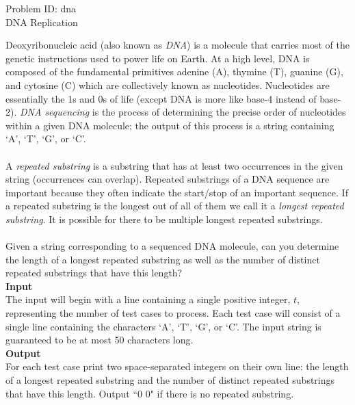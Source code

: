 \documentclass[a4paper,11pt]{article}
\begin{document}
\setcounter{page}{4}
\begin{center}
{\Huge Problem ID: dna}\vspace{2 mm} \\	%
{\huge DNA Replication}\vspace{2 mm} \\	%
\end{center}
\large{
Deoxyribonucleic acid (also known as \emph{DNA}) is a molecule that carries most of the genetic instructions used to power life on Earth. At a high level, DNA is composed of the fundamental primitives adenine (A), thymine (T), guanine (G), and cytosine (C) which are collectively known as nucleotides. Nucleotides are essentially the 1s and 0s of life (except DNA is more like base-4 instead of base-2). \emph{DNA sequencing} is the process of determining the precise order of nucleotides within a given DNA molecule; the output of this process is a string containing `A', `T', `G', or `C'.\\\\
A \emph{repeated substring} is a substring that has at least two occurrences in the given string (occurrences can overlap). Repeated substrings of a DNA sequence are important because they often indicate the start/stop of an important sequence. If a repeated substring is the longest out of all of them we call it a \emph{longest repeated substring}. It is possible for there to be multiple longest repeated substrings. \\\\
Given a string corresponding to a sequenced DNA molecule, can you determine the length of a longest repeated substring as well as the number of distinct repeated substrings that have this length?
}
\vspace{7mm}\\
\large{\bf{Input}}\vspace{2mm}\\
The input will begin with a line containing a single positive integer, $t$, representing the number of test cases to process. Each test case will consist of a single line containing the characters `A', `T', `G', or `C'. The input string is guaranteed to be at most 50 characters long.
\vspace{3mm}\\
\large{\bf{Output}}\vspace{2mm}\\
For each test case print two space-separated integers on their own line: the length of a longest repeated substring and the number of distinct repeated substrings that have this length. Output ``0 0" if there is no repeated substring.
\end{document}
